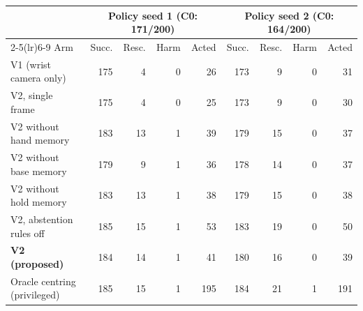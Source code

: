 \begin{tabular}{lrrrrrrrr}
\toprule
 & \multicolumn{4}{c}{Policy seed 1 (C0: 171/200)} & \multicolumn{4}{c}{Policy seed 2 (C0: 164/200)}\\
\cmidrule(lr){2-5}\cmidrule(lr){6-9}
Arm & Succ. & Resc. & Harm & Acted & Succ. & Resc. & Harm & Acted\\
\midrule
V1 (wrist camera only) & 175 & 4 & 0 & 26 & 173 & 9 & 0 & 31\\
V2, single frame & 175 & 4 & 0 & 25 & 173 & 9 & 0 & 30\\
V2 without hand memory & 183 & 13 & 1 & 39 & 179 & 15 & 0 & 37\\
V2 without base memory & 179 & 9 & 1 & 36 & 178 & 14 & 0 & 37\\
V2 without hold memory & 183 & 13 & 1 & 38 & 179 & 15 & 0 & 38\\
V2, abstention rules off & 185 & 15 & 1 & 53 & 183 & 19 & 0 & 50\\
\textbf{V2 (proposed)} & 184 & 14 & 1 & 41 & 180 & 16 & 0 & 39\\
Oracle centring (privileged) & 185 & 15 & 1 & 195 & 184 & 21 & 1 & 191\\
\bottomrule
\end{tabular}
